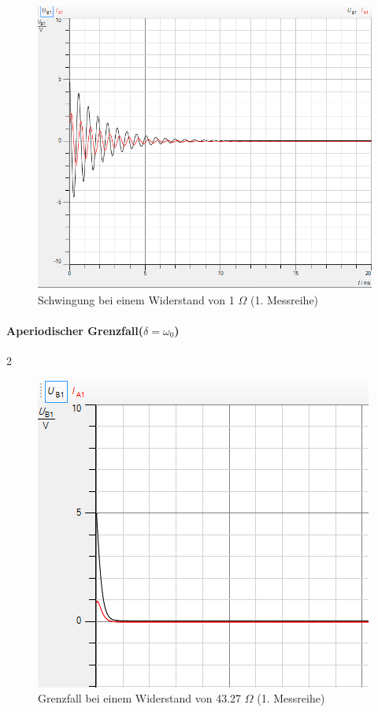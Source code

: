 \documentclass[a4paper, 11pt]{article}
\begin{document}
\begin{figure}[H]
	\centering
	\includegraphics[scale=0.4]{1_Ohm-Schwingung.png}
	\caption{Schwingung bei einem Widerstand von 1 $\Omega$ (1. Messreihe)}
	\label{fig:Schwingung}
\end{figure}


\paragraph{Aperiodischer Grenzfall($\delta = \omega_0$)} 2
\begin{figure}[H]
	\centering
	\includegraphics[scale=0.7]{Grenzfall.png}
	\caption{Grenzfall bei einem Widerstand von 43.27 $\Omega$ (1. Messreihe)}
	\label{fig:Grenzfall}
\end{figure}
\end{document}
